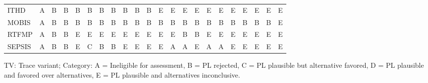 {\begin{tabular}{lccccccccccccccccccccc}
ITHD & \cellcolor[HTML]{FFFFFF} A & \cellcolor[HTML]{EA4646} B & \cellcolor[HTML]{EA4646} B & \cellcolor[HTML]{EA4646} B & \cellcolor[HTML]{EA4646} B & \cellcolor[HTML]{EA4646} B & \cellcolor[HTML]{EA4646} B & \cellcolor[HTML]{EA4646} B & \cellcolor[HTML]{EA4646} B & \cellcolor[HTML]{EA4646} B & \cellcolor[HTML]{19C8C8} E & \cellcolor[HTML]{19C8C8} E & \cellcolor[HTML]{19C8C8} E & \cellcolor[HTML]{19C8C8} E & \cellcolor[HTML]{19C8C8} E & \cellcolor[HTML]{19C8C8} E & \cellcolor[HTML]{19C8C8} E & \cellcolor[HTML]{19C8C8} E & \cellcolor[HTML]{19C8C8} E & \cellcolor[HTML]{19C8C8} E & \cellcolor[HTML]{19C8C8} E \\
MOBIS & \cellcolor[HTML]{FFFFFF} A & \cellcolor[HTML]{EA4646} B & \cellcolor[HTML]{EA4646} B & \cellcolor[HTML]{EA4646} B & \cellcolor[HTML]{EA4646} B & \cellcolor[HTML]{EA4646} B & \cellcolor[HTML]{EA4646} B & \cellcolor[HTML]{EA4646} B & \cellcolor[HTML]{EA4646} B & \cellcolor[HTML]{EA4646} B & \cellcolor[HTML]{EA4646} B & \cellcolor[HTML]{EA4646} B & \cellcolor[HTML]{EA4646} B & \cellcolor[HTML]{EA4646} B & \cellcolor[HTML]{EA4646} B & \cellcolor[HTML]{EA4646} B & \cellcolor[HTML]{EA4646} B & \cellcolor[HTML]{EA4646} B & \cellcolor[HTML]{EA4646} B & \cellcolor[HTML]{EA4646} B & \cellcolor[HTML]{19C8C8} E \\
RTFMP & \cellcolor[HTML]{FFFFFF} A & \cellcolor[HTML]{EA4646} B & \cellcolor[HTML]{EA4646} B & \cellcolor[HTML]{19C8C8} E & \cellcolor[HTML]{19C8C8} E & \cellcolor[HTML]{19C8C8} E & \cellcolor[HTML]{19C8C8} E & \cellcolor[HTML]{19C8C8} E & \cellcolor[HTML]{19C8C8} E & \cellcolor[HTML]{19C8C8} E & \cellcolor[HTML]{19C8C8} E & \cellcolor[HTML]{19C8C8} E & \cellcolor[HTML]{EA4646} B & \cellcolor[HTML]{EA4646} B & \cellcolor[HTML]{19C8C8} E & \cellcolor[HTML]{19C8C8} E & \cellcolor[HTML]{19C8C8} E & \cellcolor[HTML]{19C8C8} E & \cellcolor[HTML]{19C8C8} E & \cellcolor[HTML]{19C8C8} E & \cellcolor[HTML]{19C8C8} E \\
SEPSIS & \cellcolor[HTML]{FFFFFF} A & \cellcolor[HTML]{EA4646} B & \cellcolor[HTML]{EA4646} B & \cellcolor[HTML]{19C8C8} E & \cellcolor[HTML]{9670BD} C & \cellcolor[HTML]{EA4646} B & \cellcolor[HTML]{EA4646} B & \cellcolor[HTML]{19C8C8} E & \cellcolor[HTML]{19C8C8} E & \cellcolor[HTML]{19C8C8} E & \cellcolor[HTML]{19C8C8} E & \cellcolor[HTML]{FFFFFF} A & \cellcolor[HTML]{FFFFFF} A & \cellcolor[HTML]{19C8C8} E & \cellcolor[HTML]{FFFFFF} A & \cellcolor[HTML]{FFFFFF} A & \cellcolor[HTML]{19C8C8} E & \cellcolor[HTML]{19C8C8} E & \cellcolor[HTML]{19C8C8} E & \cellcolor[HTML]{19C8C8} E & \cellcolor[HTML]{19C8C8} E \\
\bottomrule
\end{tabular}
}
\begin{center}\footnotesize
TV: Trace variant; \quad Category: A = Ineligible for assessment, B = PL rejected, C = PL plausible but alternative favored, D = PL plausible and favored over alternatives, E = PL plausible and alternatives inconclusive.
\end{center}
